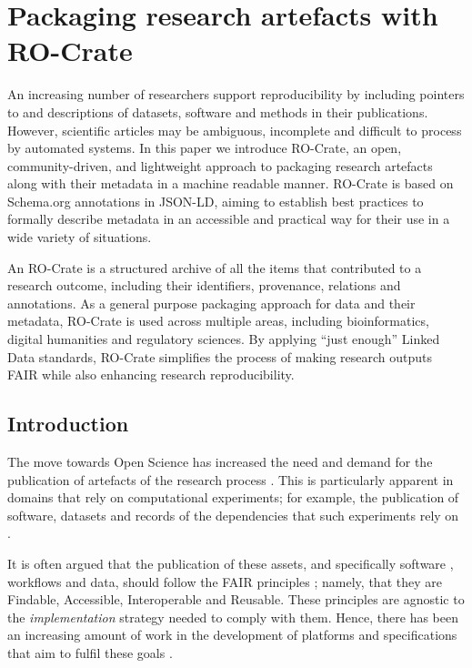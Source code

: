 \section{Packaging research artefacts with
RO-Crate}\label{ch5:packaging-research-artefacts-with-ro-crate}

An increasing number of researchers support reproducibility by including
pointers to and descriptions of datasets, software and methods in their
publications. However, scientific articles may be ambiguous, incomplete
and difficult to process by automated systems. In this paper we
introduce RO-Crate, an open, community-driven, and lightweight approach
to packaging research artefacts along with their metadata in a machine
readable manner. RO-Crate is based on Schema.org annotations in JSON-LD,
aiming to establish best practices to formally describe metadata in an
accessible and practical way for their use in a wide variety of
situations.

An RO-Crate is a structured archive of all the items that contributed to
a research outcome, including their identifiers, provenance, relations
and annotations. As a general purpose packaging approach for data and
their metadata, RO-Crate is used across multiple areas, including
bioinformatics, digital humanities and regulatory sciences. By applying
``just enough'' Linked Data standards, RO-Crate simplifies the process
of making research outputs FAIR while also enhancing research
reproducibility.

\subsection{Introduction}\label{ch5:introduction}

The move towards Open Science has increased the need and demand for the
publication of artefacts of the research process
\cite{Sefton 2021}. This is
particularly apparent in domains that rely on computational experiments;
for example, the publication of software, datasets and records of the
dependencies that such experiments rely on
\cite{Stodden 2016}.

It is often argued that the publication of these assets, and
specifically software
\cite{Lamprecht 2019}, workflows
\cite{ch5-55} and data, should
follow the FAIR principles
\cite{Wilkinson 2016}; namely, that
they are Findable, Accessible, Interoperable and Reusable. These
principles are agnostic to the \emph{implementation} strategy needed to
comply with them. Hence, there has been an increasing amount of work in
the development of platforms and specifications that aim to fulfil these
goals \cite{ch5-91}.


